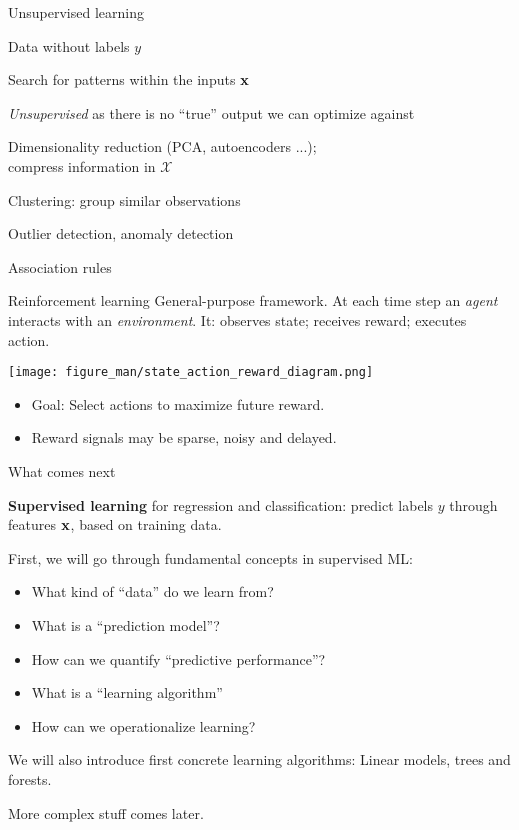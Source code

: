 \documentclass[11pt,compress,t,notes=noshow, xcolor=table]{beamer}
\begin{document}
\begin{framei}{Unsupervised learning}
\item Data without labels $y$
\item Search for patterns within the inputs $\mathbf{x}$
\item \textit{Unsupervised} as there is no ``true'' output we can optimize against

\vfill

{
\item Dimensionality reduction (PCA, autoencoders ...);\\ 
  compress information in $\mathcal X$
\item Clustering: group similar observations
\item Outlier detection, anomaly detection
\item Association rules
}
\end{framei}


\begin{frame}{Reinforcement learning}
General-purpose framework.
At each time step an \emph{agent} interacts with an \emph{environment}. 
It: observes state; receives reward; executes action.

\begin{center}
\texttt{[image: figure\_man/state\_action\_reward\_diagram.png]} %
\end{center}

\begin{itemize}
\item Goal: Select actions to maximize future reward.
\item Reward signals may be sparse, noisy and delayed.
\end{itemize}
\end{frame}


\begin{framei}{What comes next}
\item \textbf{Supervised learning} for regression and classification: predict labels $y$ through features $\mathbf{x}$, based on training data.
\item First, we will go through fundamental concepts in supervised ML: 
\begin{itemize}
  \item What kind of ``data'' do we learn from?
  \item What is a ``prediction model''?
  \item How can we quantify ``predictive performance''?
  \item What is a ``learning algorithm'' 
  \item How can we operationalize learning?
\end{itemize}
\item We will also introduce first concrete learning algorithms: Linear models, trees and forests. 
\item More complex stuff comes later.
\end{framei}

\endlecture
\end{document}
